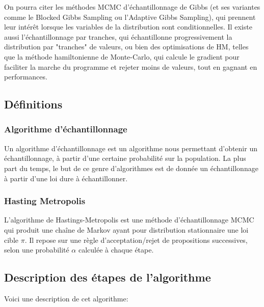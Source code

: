 \documentclass{article}
\begin{document}
On pourra citer les méthodes MCMC d'échantillonnage de Gibbs (et ses variantes comme le Blocked Gibbs Sampling ou l'Adaptive Gibbs Sampling), qui prennent leur intérêt lorsque les variables de la distribution sont conditionnelles. Il existe aussi l'échantillonnage par tranches, qui échantillonne progressivement la distribution par "tranches" de valeurs, ou bien des optimisations de HM, telles que la méthode hamiltonienne de Monte-Carlo, qui calcule le gradient pour faciliter la marche du programme et rejeter moins de valeurs, tout en gagnant en performances. \\

\subsection{Définitions}

\subsubsection{Algorithme d'échantillonnage}

Un algorithme d'échantillonnage est un algorithme nous permettant d'obtenir un échantillonnage, à partir d'une certaine probabilité sur la population.
La plus part du temps, le but de ce genre d'algorithmes est de donnée un échantillonnage à partir d'une loi dure à échantillonner.
\subsubsection{Hasting Metropolis}

L’algorithme de Hastings-Metropolis est une méthode d’échantillonnage MCMC qui produit une chaîne de Markov ayant pour distribution stationnaire une loi cible $\pi$. 
Il repose sur une règle d’acceptation/rejet de propositions successives, selon une probabilité $\alpha$ calculée à chaque étape.

\label{description-algo-hast-met}
\subsection{Description des étapes de l'algorithme}

Voici une description de cet algorithme:
\end{document}
